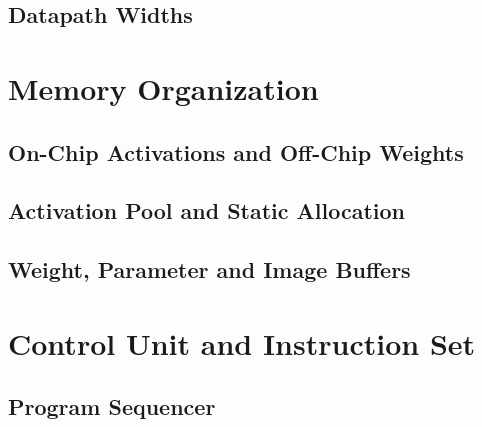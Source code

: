 \subsection{Datapath Widths}
\label{sec:widths}

\section{Memory Organization}
\label{sec:memory}

\subsection{On-Chip Activations and Off-Chip Weights}
\label{sec:mem-split}

\subsection{Activation Pool and Static Allocation}
\label{sec:act-pool}

\subsection{Weight, Parameter and Image Buffers}
\label{sec:buffers}

\section{Control Unit and Instruction Set}
\label{sec:control}

\subsection{Program Sequencer}
\label{sec:sequencer}

